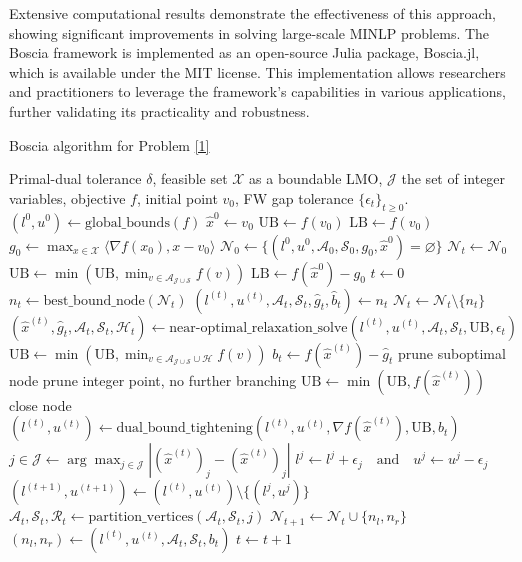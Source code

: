 Extensive computational results demonstrate the effectiveness of this approach, showing significant improvements in solving large-scale MINLP problems. The Boscia framework is implemented as an open-source Julia package, Boscia.jl, which is available under the MIT license. This implementation allows researchers and practitioners to leverage the framework's capabilities in various applications, further validating its practicality and robustness.

\newpage

\begin{algorithm}[H]
	\caption{Boscia algorithm for Problem \eqref{1}}
	\label{alg:boscia}
	\begin{algorithmic}[1]
		\REQUIRE Primal-dual tolerance $\delta$, feasible set $\mathcal{X}$ as a boundable LMO, $\mathcal{J}$ the set of integer variables, objective $f$, initial point $v_0$, FW gap tolerance $\{\epsilon_t\}_{t \geq 0}$.
		\STATE $(l^0, u^0) \gets \text{global\_bounds}(f)$
		\STATE $\hat{x}^0 \gets v_0$
		\STATE $\text{UB} \gets f(v_0)$
		\STATE $\text{LB} \gets f(v_0)$
		\STATE $g_0 \gets \max_{x \in \mathcal{X}} \langle \nabla f(x_0), x - v_0 \rangle$
		\STATE $\mathcal{N}_0 \gets \{(l^0, u^0, \mathcal{A}_0, \mathcal{S}_0, g_0, \hat{x}^0) = \varnothing \}$
		\STATE $\mathcal{N}_t \gets \mathcal{N}_0$
		\STATE $\text{UB} \gets \min(\text{UB}, \min_{v \in \mathcal{A}_{\mathcal{J} \cup \mathcal{S}}} f(v))$
		\STATE $\text{LB} \gets f(\hat{x}^0) - g_0$
		\STATE $t \gets 0$
		\STATE $n_t \gets \text{best\_bound\_node}(\mathcal{N}_t)$
		\STATE $(l^{(t)}, u^{(t)}, \mathcal{A}_t, \mathcal{S}_t, \hat{g}_t, \hat{b}_t) \gets n_t$
		\STATE $\mathcal{N}_t \gets \mathcal{N}_t \setminus \{n_t\}$
		\STATE $(\hat{x}^{(t)}, \hat{g}_t, \mathcal{A}_t, \mathcal{S}_t, \mathcal{H}_t) \gets \text{near-optimal\_relaxation\_solve}(l^{(t)}, u^{(t)}, \mathcal{A}_t, \mathcal{S}_t, \text{UB}, \epsilon_t)$
		\STATE $\text{UB} \gets \min(\text{UB}, \min_{v \in \mathcal{A}_{\mathcal{J} \cup \mathcal{S}} \cup \mathcal{H}} f(v))$
		\STATE $b_t \gets f(\hat{x}^{(t)}) - \hat{g}_t$
		\STATE prune suboptimal node
		\STATE prune integer point, no further branching
		\STATE $\text{UB} \gets \min(\text{UB}, f(\hat{x}^{(t)}))$
		\STATE close node
		\ELSE
		\STATE $(l^{(t)}, u^{(t)}) \gets \text{dual\_bound\_tightening}(l^{(t)}, u^{(t)}, \nabla f(\hat{x}^{(t)}), \text{UB}, b_t)$
		\STATE $j \in \mathcal{J} \gets \arg \max_{j \in \mathcal{J}} |(\hat{x}^{(t)})_j - (\hat{x}^{(t)})_j|$ 
		\STATE $l^j \gets l^j + \epsilon_j \quad \text{and} \quad u^j \gets u^j - \epsilon_j$ 
		\STATE $(l^{(t+1)}, u^{(t+1)}) \gets (l^{(t)}, u^{(t)}) \setminus \{(l^j, u^j)\}$
		\STATE $\mathcal{A}_t, \mathcal{S}_t, \mathcal{R}_t \gets \text{partition\_vertices}(\mathcal{A}_t, \mathcal{S}_t, j)$
		\STATE $\mathcal{N}_{t+1} \gets \mathcal{N}_{t} \cup \{n_l, n_r\}$
		\STATE $(n_l, n_r) \gets (l^{(t)}, u^{(t)}, \mathcal{A}_t, \mathcal{S}_t, b_t)$
		\ENDIF
		\STATE $t \gets t + 1$
		\ENDWHILE
	\end{algorithmic}
\end{algorithm}

